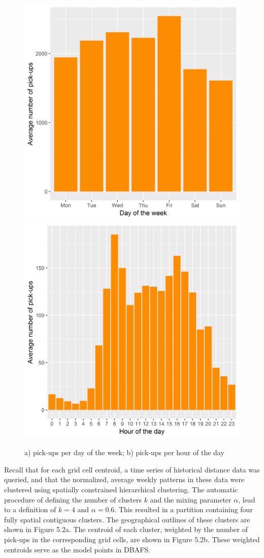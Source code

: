 \documentclass[12pt,oneside]{reedthesis}
\begin{document}
\begin{figure}[H]
\includegraphics[width=0.5\linewidth]{Figures/usageday} \includegraphics[width=0.5\linewidth]{Figures/usagehour} \caption{a) pick-ups per day of the week; b) pick-ups per hour of the day}\label{fig:usageplots}
\end{figure}
Recall that for each grid cell centroid, a time series of historical
distance data was queried, and that the normalized, average weekly
patterns in these data were clustered using spatially constrained
hierarchical clustering. The automatic procedure of defining the number
of clusters \(k\) and the mixing parameter \(\alpha\), lead to a
definition of \(k = 4\) and \(\alpha = 0.6\). This resulted in a
partition containing four fully spatial contiguous clusters. The
geographical outlines of these clusters are shown in Figure 5.2a. The
centroid of each cluster, weighted by the number of pick-ups in the
corresponding grid cells, are shown in Figure 5.2b. These weighted
centroids serve as the model points in DBAFS.
\end{document}
